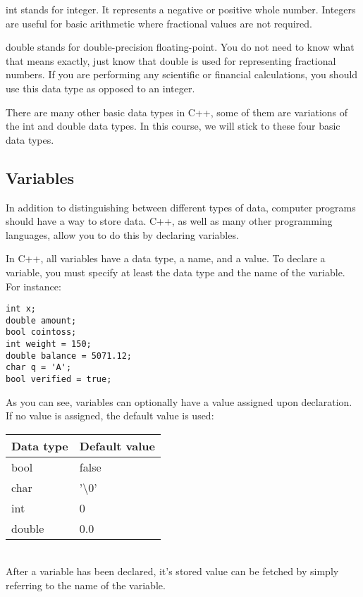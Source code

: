 \documentclass[a4paper,12pt]{article}
\begin{document}
int stands for integer. It represents a negative or positive whole number. Integers are useful for basic arithmetic where fractional values are not required. 

double stands for double-precision floating-point. You do not need to know what that means exactly, just know that double is used for representing fractional numbers. If you are performing any scientific or financial calculations, you should use this data type as opposed to an integer. 

There are many other basic data types in C++, some of them are variations of the int and double data types. In this course, we will stick to these four basic data types.

\subsection*{Variables}

In addition to distinguishing between different types of data, computer programs should have a way to store data. C++, as well as many other programming languages, allow you to do this by declaring variables.

In C++, all variables have a data type, a name, and a value. To declare a variable, you must specify at least the data type and the name of the variable. For instance:

\begin{lstlisting}[caption=A series of variable declarations in C++]
int x;
double amount;
bool cointoss;
int weight = 150;
double balance = 5071.12;
char q = 'A';
bool verified = true;
\end{lstlisting}

As you can see, variables can optionally have a value assigned upon declaration. If no value is assigned, the default value is used: \\

\begin{tabular}{|l|l|}
\hline
{\bf Data type} & {\bf Default value} \\
\hline
bool & false \\
\hline
char & '\textbackslash 0' \\
\hline
int & 0 \\
\hline
double & 0.0 \\
\hline
\end{tabular} \\

After a variable has been declared, it's stored value can be fetched by simply referring to the name of the variable. 
\end{document}
